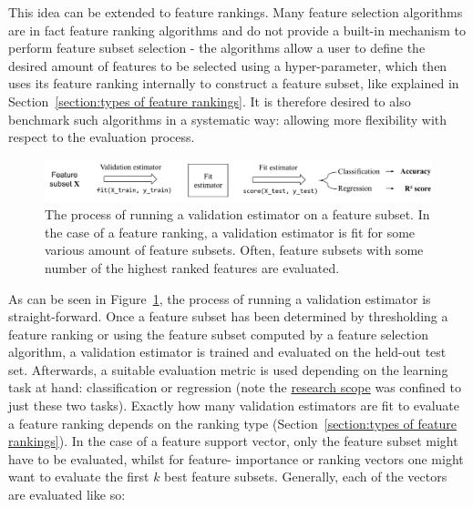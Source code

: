 \documentclass{article}
\begin{document}
This idea can be extended to feature rankings. Many feature selection algorithms are in fact feature ranking algorithms and do not provide a built-in mechanism to perform feature subset selection - the algorithms allow a user to define the desired amount of features to be selected using a hyper-parameter, which then uses its feature ranking internally to construct a feature subset, like explained in Section~\ref{section:types of feature rankings}. It is therefore desired to also benchmark such algorithms in a systematic way: allowing more flexibility with respect to the evaluation process.

\begin{figure}[ht]
    \centering
    \includegraphics[width=\linewidth]{report/images/schematic-validation-estimators.pdf}
    \caption{The process of running a validation estimator on a feature subset. In the case of a feature ranking, a validation estimator is fit for some various amount of feature subsets. Often, feature subsets with some number of the highest ranked features are evaluated.}
    \label{fig:schematic-validation-estimators}
\end{figure}

As can be seen in Figure~\ref{fig:schematic-validation-estimators}, the process of running a validation estimator is straight-forward. Once a feature subset has been determined by thresholding a feature ranking or using the feature subset computed by a feature selection algorithm, a validation estimator is trained and evaluated on the held-out test set. Afterwards, a suitable evaluation metric is used depending on the learning task at hand: classification or regression (note the \hyperref[section:introduction]{research scope} was confined to just these two tasks). Exactly how many validation estimators are fit to evaluate a feature ranking depends on the ranking type (Section~\ref{section:types of feature rankings}). In the case of a feature support vector, only the feature subset might have to be evaluated, whilst for feature- importance or ranking vectors one might want to evaluate the first $k$ best feature subsets. Generally, each of the vectors are evaluated like so:
\end{document}
